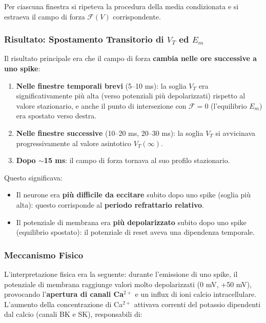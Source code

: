Per ciascuna finestra si ripeteva la procedura della media condizionata e si estraeva il campo di forza $\mathcal{F}(V)$ corrispondente.

\subsubsection{Risultato: Spostamento Transitorio di $V_T$ ed $E_m$}

Il risultato principale era che il campo di forza \textbf{cambia nelle ore successive a uno spike}:

\begin{enumerate}
    \item \textbf{Nelle finestre temporali brevi} (5–10 ms): la soglia $V_T$ era significativamente più alta (verso potenziali più depolarizzati) rispetto al valore stazionario, e anche il punto di intersezione con $\mathcal{F} = 0$ (l'equilibrio $E_m$) era spostato verso destra.
    \item \textbf{Nelle finestre successive} (10–20 ms, 20–30 ms): la soglia $V_T$ si avvicinava progressivamente al valore asintotico $V_T(\infty)$.
    \item \textbf{Dopo $\sim$15 ms}: il campo di forza tornava al suo profilo stazionario.
\end{enumerate}

Questo significava:

\begin{itemize}
    \item Il neurone era \textbf{più difficile da eccitare} subito dopo uno spike (soglia più alta): questo corrisponde al \textbf{periodo refrattario relativo}.
    \item Il potenziale di membrana era \textbf{più depolarizzato} subito dopo uno spike (equilibrio spostato): il potenziale di reset aveva una dipendenza temporale.
\end{itemize}

\subsubsection{Meccanismo Fisico}

L'interpretazione fisica era la seguente: durante l'emissione di uno spike, il potenziale di membrana raggiunge valori molto depolarizzati (0 mV, +50 mV), provocando l'\textbf{apertura di canali Ca$^{2+}$} e un influx di ioni calcio intracellulare. L'aumento della concentrazione di Ca$^{2+}$ attivava correnti del potassio dipendenti dal calcio (canali BK e SK), responsabili di:

